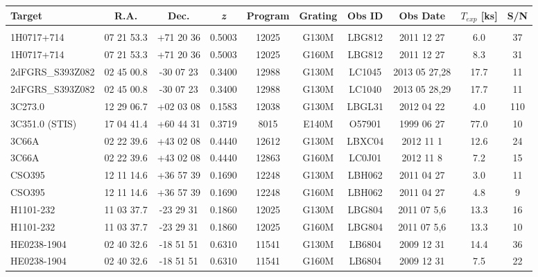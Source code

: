 \documentclass[iop]{emulateapj-rtx4}
\begin{document}
\begin{table}[ht]\footnotesize
\begin{center}
\begin{tabular}{l c c c c c c c c c}
 \hline \hline
  Target & R.A. & Dec. & \textit{z} & Program & Grating & Obs ID & Obs Date & $T_{exp}$ [ks] & S/N  \\ \hline
   
\\
 1H0717+714 				& 07 21 53.3  &  +71 20 36  &  0.5003 & 12025	& G130M      & LBG812  & 2011 12 27  &     6.0 &  37  \\
 1H0717+714 				& 07 21 53.3  &  +71 20 36  &  0.5003 & 12025	& G160M      & LBG812  & 2011 12 27  &     8.3 &  31  \\
 2dFGRS\_S393Z082 		& 02 45 00.8  &  -30 07 23   &  0.3400  & 12988 & G130M     & LC1045   & 2013 05 27,28 & 17.7 & 11  \\
 2dFGRS\_S393Z082 		& 02 45 00.8  &  -30 07 23   &  0.3400  & 12988 & G130M     & LC1040   & 2013 05 28,29 & 17.7 & 11  \\
 3C273.0 					& 12 29 06.7  &  +02 03 08  &  0.1583 &12038   & G130M     & LBGL31  & 2012 04 22  &     4.0 &  110  \\
 3C351.0 (STIS)                        & 17 04 41.4  &  +60 44 31  &  0.3719 &  8015   & E140M      & O57901   & 1999 06 27   &  77.0 &  10  \\
 3C66A 					& 02 22 39.6  &  +43 02 08  &  0.4440  & 12612 & G130M     & LBXC04   & 2012 11 1    & 12.6 &  24  \\
 3C66A 					& 02 22 39.6  &  +43 02 08  &  0.4440  & 12863 & G160M     & LC0J01    & 2012 11 8    &  7.2  &  15  \\
 CSO395 					& 12 11 14.6  &  +36 57 39  &  0.1690 & 12248	& G130M      & LBH062   & 2011 04 27  &     3.0 &  11  \\
 CSO395 					& 12 11 14.6  &  +36 57 39  &  0.1690 & 12248	& G160M      & LBH062   & 2011 04 27  &     4.8 &  9  \\
 H1101-232 				& 11 03 37.7  &  -23 29 31   &  0.1860 & 12025 & G130M      & LBG804  & 2011 07 5,6  &   13.3 &  16  \\
 H1101-232 				& 11 03 37.7  &  -23 29 31   &  0.1860 & 12025 & G160M      & LBG804  & 2011 07 5,6  &   13.3 &  10  \\
 HE0238-1904 				& 02 40 32.6  &  -18 51 51   &  0.6310 & 11541 & G130M      & LB6804   & 2009 12 31  &   14.4 &  36  \\
 HE0238-1904 				& 02 40 32.6  &  -18 51 51   &  0.6310 & 11541 & G160M      & LB6804   & 2009 12 31  &   7.5 &  22  \\

\end{tabular}
\end{center}
\end{table}
\end{document}
